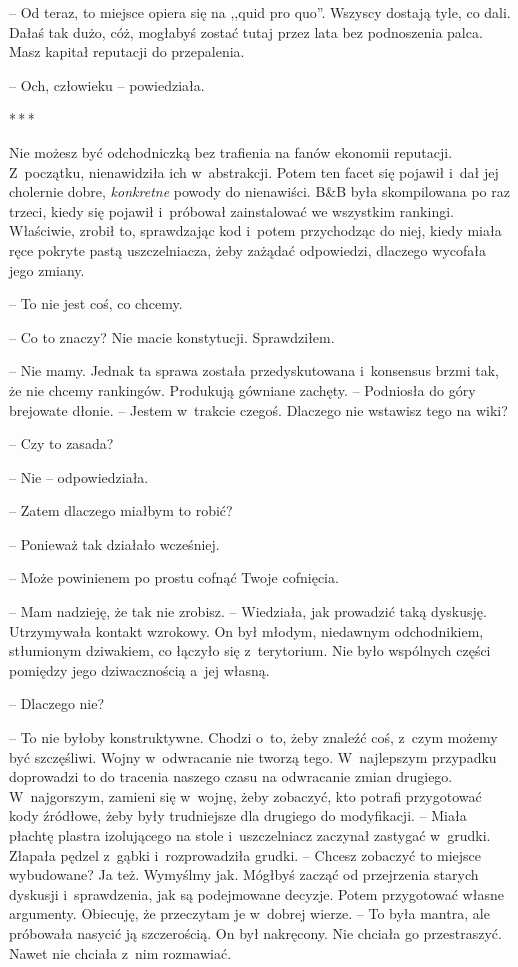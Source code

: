 \documentclass[oneside,polish,11pt,sfheadings]{mwbk}
\newcommand{\threeast}{\bigskip\par\centerline{*\,*\,*}\medskip\par}
\begin{document}
-- Od teraz, to miejsce opiera się na ,,quid pro quo''. Wszyscy dostają
tyle, co dali. Dałaś tak dużo, cóż, mogłabyś zostać tutaj przez lata bez
podnoszenia palca. Masz kapitał reputacji do przepalenia.

-- Och, człowieku -- powiedziała.

\threeast

Nie możesz być odchodniczką bez trafienia na fanów ekonomii reputacji. Z~początku, nienawidziła ich w~abstrakcji. Potem ten facet się pojawił i~dał jej cholernie dobre, \textit{konkretne} powody do nienawiści. B\&B
była skompilowana po raz trzeci, kiedy się pojawił i~próbował
zainstalować we wszystkim rankingi. Właściwie, zrobił to, sprawdzając
kod i~potem przychodząc do niej, kiedy miała ręce pokryte pastą
uszczelniacza, żeby zażądać odpowiedzi, dlaczego wycofała jego zmiany.

-- To nie jest coś, co chcemy.

-- Co to znaczy? Nie macie konstytucji. Sprawdziłem.

-- Nie mamy. Jednak ta sprawa została przedyskutowana i~konsensus brzmi
tak, że nie chcemy rankingów. Produkują gówniane zachęty. -- Podniosła do
góry brejowate dłonie. -- Jestem w~trakcie czegoś. Dlaczego nie wstawisz
tego na wiki?

-- Czy to zasada?

-- Nie -- odpowiedziała.

-- Zatem dlaczego miałbym to robić?

-- Ponieważ tak działało wcześniej.

-- Może powinienem po prostu cofnąć Twoje cofnięcia.

-- Mam nadzieję, że tak nie zrobisz. -- Wiedziała, jak prowadzić taką
dyskusję. Utrzymywała kontakt wzrokowy. On był młodym, niedawnym
odchodnikiem, stłumionym dziwakiem, co łączyło się z~terytorium. Nie
było wspólnych części pomiędzy jego dziwacznością a~jej własną.

-- Dlaczego nie?

-- To nie byłoby konstruktywne. Chodzi o~to, żeby znaleźć coś, z~czym
możemy być szczęśliwi. Wojny w~odwracanie nie tworzą tego. W~najlepszym
przypadku doprowadzi to do tracenia naszego czasu na odwracanie zmian
drugiego. W~najgorszym, zamieni się w~wojnę, żeby zobaczyć, kto potrafi
przygotować kody źródłowe, żeby były trudniejsze dla drugiego do
modyfikacji. -- Miała płachtę plastra izolującego na stole i~uszczelniacz
zaczynał zastygać w~grudki. Złapała pędzel z~gąbki i~rozprowadziła
grudki. -- Chcesz zobaczyć to miejsce wybudowane? Ja też. Wymyślmy jak.
Mógłbyś zacząć od przejrzenia starych dyskusji i~sprawdzenia, jak są
podejmowane decyzje. Potem przygotować własne argumenty. Obiecuję, że
przeczytam je w~dobrej wierze. -- To była mantra, ale próbowała nasycić
ją szczerością. On był nakręcony. Nie chciała go przestraszyć. Nawet nie
chciała z~nim rozmawiać.
\end{document}
